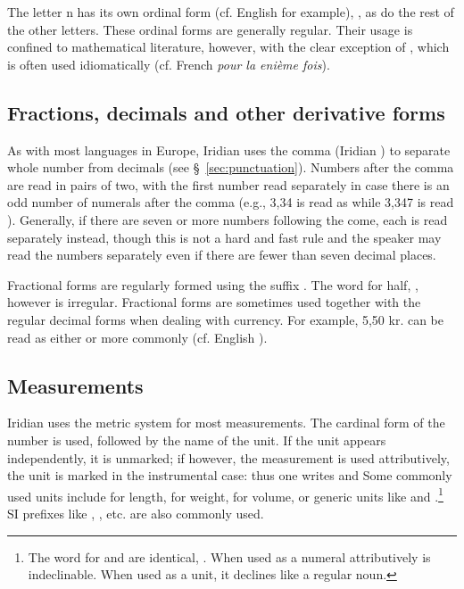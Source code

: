 The letter n has its own ordinal form (cf. English  for example),
, as do the rest of the other letters. These ordinal forms are
generally regular. Their usage is confined to mathematical literature, however,
with the clear exception of , which is often used idiomatically (cf.
French \textit{pour la enième fois}).


\subsection{Fractions, decimals and other derivative forms}
\label{sec:fractions}

As with most languages in Europe, Iridian uses the comma (Iridian ) to
separate whole number from decimals (see \S~\ref{sec:punctuation}). Numbers
after the comma are read in pairs of two, with the first number read separately
in case there is an odd number of numerals after the comma (e.g., 3,34 is read
as  while 3,347 is read ). Generally, if there are seven or more numbers following the come,
each is read separately instead, though this is not a hard and fast rule and the
speaker may read the numbers separately even if there are fewer than seven
decimal places.

Fractional forms are regularly formed using the suffix . The word
for half, , however is irregular. Fractional forms are sometimes used
together with the regular decimal forms when dealing with currency. For example,
5,50 kr. can be read as either  or more commonly
 (cf. English ).

\subsection{Measurements}\label{sec:measurements}

Iridian uses the metric system for most measurements. The cardinal form of the
number is used, followed by the name of the unit. If the unit appears
independently, it is unmarked; if however, the measurement is used
attributively, the unit is marked in the instrumental case: thus one writes
 and  Some commonly used units include  for length,
 for weight,  for volume, or generic units
like    and
.\footnote{The word for  and  are
identical, . When used as a numeral attributively  is
indeclinable. When used as a unit, it declines like a regular noun.} SI prefixes
like , , etc. are also commonly used.

